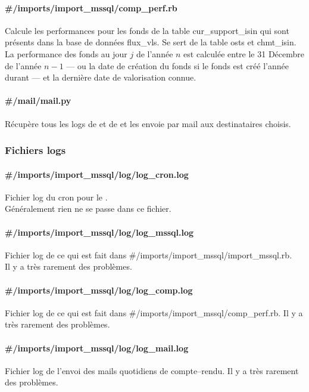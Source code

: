 \paragraph{{\#}/imports/import{\_}mssql/comp{\_}perf.rb}
Calcule les performances pour les fonds de la table {\og}cur{\_}support{\_}isin{\fg}  qui sont présents dans la base de données flux{\_}vls. Se sert de la table {\og} osts{\fg} et {\og} chmt{\_}isin{\fg}. La performance des fonds au jour $j$ de l'année $n$ est calculée entre le 31 Décembre de l'année $n-1$ --- ou la date de création du fonds si le fonds est créé l'année durant --- et la dernière date de valorisation connue. 

\paragraph{{\#}/mail/mail.py}
Récupère tous les logs de  et de  et les envoie par mail aux destinataires choisis.

\subsubsection{Fichiers logs}
\paragraph{{\#}/imports/import{\_}mssql/log/log{\_}cron.log}
Fichier log du cron pour le .\\Généralement rien ne se passe dans ce fichier.
\paragraph{{\#}/imports/import{\_}mssql/log/log{\_}mssql.log}
Fichier log de ce qui est fait dans {\#}/imports/import{\_}mssql/import{\_}mssql.rb.\\
Il y a très rarement des problèmes.
\paragraph{{\#}/imports/import{\_}mssql/log/log{\_}comp.log}
Fichier log de ce qui est fait dans {\#}/imports/import{\_}mssql/comp{\_}perf.rb.
Il y a très rarement des problèmes.
\paragraph{{\#}/imports/import{\_}mssql/log/log{\_}mail.log}
Fichier log de l'envoi des mails quotidiens de compte--rendu.
Il y a très rarement des problèmes.

